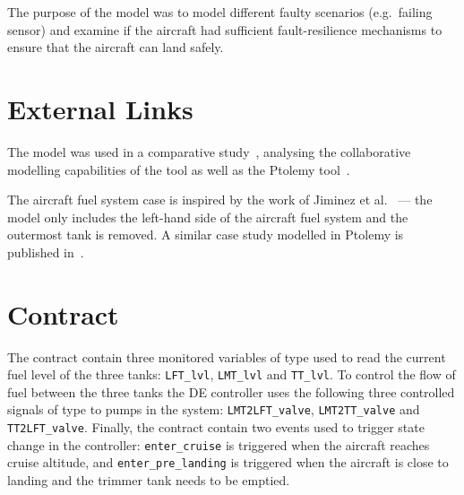 The purpose of the model was to model different faulty scenarios
(e.g.\ failing sensor) and examine if the aircraft had sufficient
fault-resilience mechanisms to ensure that the aircraft can land
safely.


\section{External Links}

The model was used in a comparative study~\cite{Wolff&12}, analysing
the collaborative modelling capabilities of the \DESTECS tool as well
as the Ptolemy tool~\cite{Buck&94,Davis&99,Eker&03}.

The aircraft fuel system case is inspired by the work of Jiminez et
al.~\cite{Jimenez&07} --- the \DESTECS model only includes the
left-hand side of the aircraft fuel system and the outermost tank is
removed. A similar case study modelled in Ptolemy is published
in~\cite{DerlerLeeSangiovanniVincentelli11_ModelingCyberPhysicalSystems}.


\section{Contract}

The contract contain three monitored variables of type 
used to read the current fuel level of the three tanks:
\texttt{LFT\_lvl}, \texttt{LMT\_lvl} and \texttt{TT\_lvl}. To control
the flow of fuel between the three tanks the DE controller uses the
following three controlled signals of type  to pumps in the
system: \texttt{LMT2LFT\_valve}, \texttt{LMT2TT\_valve} and
\texttt{TT2LFT\_valve}. Finally, the contract contain two events used
to trigger state change in the controller: \texttt{enter\_cruise} is
triggered when the aircraft reaches cruise altitude, and
\texttt{enter\_pre\_landing} is triggered when the aircraft is close
to landing and the trimmer tank needs to be emptied.

